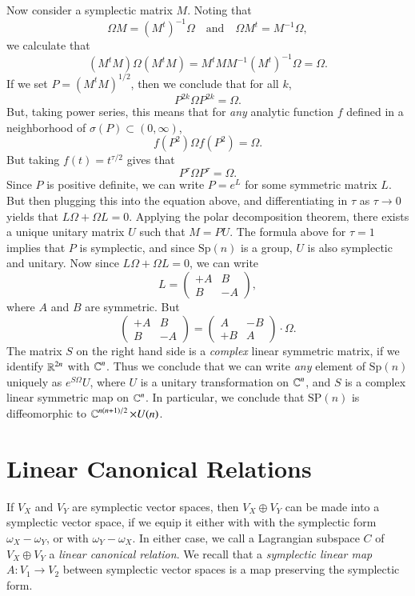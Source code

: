 Now consider a symplectic matrix $M$. Noting that
%
\[ \Omega M = (M^t)^{-1} \Omega \quad\text{and}\quad \Omega M^t = M^{-1} \Omega, \]
%
we calculate that
%
\[ (M^t M) \Omega (M^t M) = M^t M M^{-1} (M^t)^{-1} \Omega = \Omega. \]
%
If we set $P = (M^t M)^{1/2}$, then we conclude that for all $k$,
%
\[ P^{2k} \Omega P^{2k} = \Omega. \]
%
But, taking power series, this means that for \emph{any} analytic function $f$ defined in a neighborhood of $\sigma(P) \subset (0,\infty)$,
%
\[ f(P^2) \Omega f(P^2) = \Omega. \]
%
But taking $f(t) = t^{\tau / 2}$ gives that
%
\[ P^\tau \Omega P^\tau = \Omega. \]
%
Since $P$ is positive definite, we can write $P = e^L$ for some symmetric matrix $L$. But then plugging this into the equation above, and differentiating in $\tau$ as $\tau \to 0$ yields that $L \Omega + \Omega L = 0$. Applying the polar decomposition theorem, there exists a unique unitary matrix $U$ such that $M = PU$. The formula above for $\tau = 1$ implies that $P$ is symplectic, and since $\text{Sp}(n)$ is a group, $U$ is also symplectic and unitary. Now since $L \Omega + \Omega L = 0$, we can write
%
\[ L = \begin{pmatrix} +A & B \\ B & -A \end{pmatrix}, \]
%
where $A$ and $B$ are symmetric. But
%
\[ \begin{pmatrix} +A & B \\ B & -A \end{pmatrix} = \begin{pmatrix} A & -B \\ +B & A \end{pmatrix} \cdot \Omega. \]
%
The matrix $S$ on the right hand side is a \emph{complex} linear symmetric matrix, if we identify $\operatorname{\mathbb{R}}^{2n}$ with $\operatorname{\mathbb{C}}^n$. Thus we conclude that we can write \emph{any} element of $\text{Sp}(n)$ uniquely as $e^{S \Omega} U$, where $U$ is a unitary transformation on $\operatorname{\mathbb{C}}^{n}$, and $S$ is a complex linear symmetric map on $\operatorname{\mathbb{C}}^n$. In particular, we conclude that $\text{SP}(n)$ is diffeomorphic to $\operatorname{\mathbb{C}}^{n(n+1)/2} \times U(n)$.

\section{Linear Canonical Relations}

If $V_X$ and $V_Y$ are symplectic vector spaces, then $V_X \oplus V_Y$ can be made into a symplectic vector space, if we equip it either with with the symplectic form $\omega_X - \omega_Y$, or with $\omega_Y - \omega_X$. In either case, we call a Lagrangian subspace $C$ of $V_X \oplus V_Y$ a \emph{linear canonical relation}. We recall that a \emph{symplectic linear map} $A: V_1 \to V_2$ between symplectic vector spaces is a map preserving the symplectic form.

